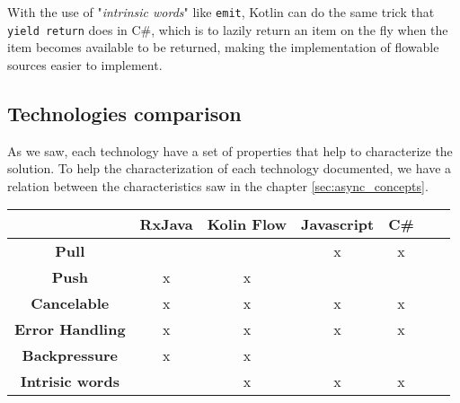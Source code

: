 With the use of "\textit{intrinsic words}" like \texttt{emit}, Kotlin can do the same trick that \texttt{yield return} does in C\#, which is to lazily return an item on the fly when the item becomes available to be returned, making the implementation of flowable sources easier to implement.





\subsection{Technologies comparison}

As we saw, each technology have a set of properties that help to characterize the solution.
To help the characterization of each technology documented, we have a relation between the characteristics saw in the chapter \ref{sec:async_concepts}.

\begin{table}[!htbp]
	\begin{tabular}{|c|c|c|c|c|c|c|}
	\hline
										  & \textbf{RxJava} & \textbf{Kolin Flow} & \multicolumn{1}{l|}{\textbf{Javascript}} & \multicolumn{1}{l|}{\textbf{C\#}} \\ \hline
	\textbf{Pull}                         &               &              & x                                        & x   		   								\\ \hline
	\textbf{Push}                   	  & x             & x             &                                         &    	  								 \\ \hline
	\textbf{Cancelable}     			  & x             & x             & x                                       & x          								 \\ \hline
	\textbf{Error Handling} 			  & x             & x             & x                                       & x   		   									\\ \hline
	\textbf{Backpressure} 			      & x             & x             &                                         &      									   \\ \hline
	\textbf{Intrisic words} 			  &               & x             & x                                       & x      									     \\ \hline
	\end{tabular}
\end{table}